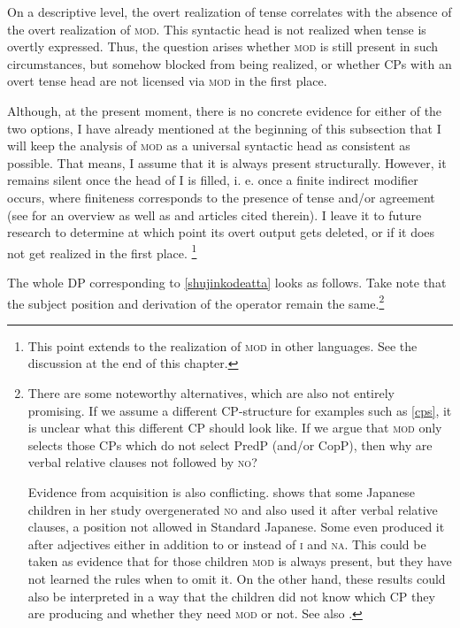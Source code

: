 \documentclass [output=book,colorlinks,citecolor=brown]{langscibook}
\begin{document}
On a descriptive level, the overt realization of tense correlates with the absence of the overt realization of \textsc{mod}. This syntactic head is not realized when tense is overtly expressed. Thus, the question arises whether \textsc{mod} is still present in such circumstances, but somehow blocked from being realized, or whether CPs with an overt tense head are not licensed via \textsc{mod} in the first place.

Although, at the present moment, there is no concrete evidence for either of the two options, I have already mentioned at the beginning of this subsection that I will keep the analysis of \textsc{mod} as a universal syntactic head as consistent as possible. That means, I assume that it is always present structurally. However, it remains silent once the head of I is filled, i. e. once a finite indirect modifier occurs, where finiteness corresponds to the presence of tense and/or agreement (see \citealt[103–108]{landau:2013:control} for an overview as well as \citealt{nikolaeva:2007:intro} and articles cited therein). I leave it to future research to determine at which point its overt output gets deleted, or if it does not get realized in the first place. \footnote{This point extends to the realization of \textsc{mod} in other languages. See the discussion at the end of this chapter.}

The whole DP corresponding to \ref{shujinkodeatta} looks as follows. Take note that the subject position and derivation of the operator remain the same.\footnote{There are some noteworthy alternatives, which are also not entirely promising. If we assume a different CP-structure for examples such as \ref{cps}, it is unclear what this different CP should look like. If we argue that \textsc{mod} only selects those CPs which do not select PredP (and/or CopP), then why are verbal relative clauses not followed by \textsc{no}?

\par

Evidence from acquisition is also conflicting. \citet[chapters 4 and 5]{murasugi:1991:noun} shows that some Japanese children in her study overgenerated \textsc{no} and also used it after verbal relative clauses, a position not allowed in Standard Japanese. Some even produced it after adjectives either in addition to or instead of \textsc{i} and \textsc{na}. This could be taken as evidence that for those children \textsc{mod} is always present, but they have not learned the rules when to omit it. On the other hand, these results could also be interpreted in a way that the children did not know which CP they are producing and whether they need \textsc{mod} or not. See also \citet[ch. 3.5]{yamakido:2005:nature}.}
\end{document}
